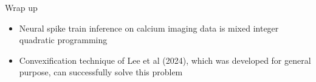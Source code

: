 \documentclass[15pt]{beamer}
\theoremstyle{definition}
\begin{document}
\begin{frame}{Wrap up}
	\begin{itemize}
		\item Neural spike train inference on calcium imaging data is mixed integer quadratic programming
		\item Convexification technique of Lee et al (2024), which was developed for general purpose, can successfully solve this problem
	\end{itemize}
\end{frame}



\end{document}
